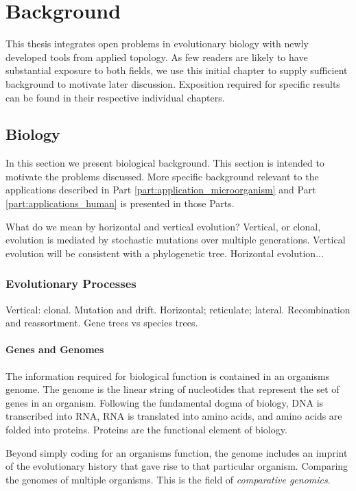 \chapter{Background}
\label{ch:background}

This thesis integrates open problems in evolutionary biology with newly developed tools from applied topology.
As few readers are likely to have substantial exposure to both fields, we use this initial chapter to supply sufficient background to motivate later discussion.
Exposition required for specific results can be found in their respective individual chapters.

\section{Biology}

In this section we present biological background.
This section is intended to motivate the problems discussed.
More specific background relevant to the applications described in Part \ref{part:application_microorganism} and Part \ref{part:applications_human} is presented in those Parts.

What do we mean by horizontal and vertical evolution?
Vertical, or clonal, evolution is mediated by stochastic mutations over multiple generations.
Vertical evolution will be consistent with a phylogenetic tree.
Horizontal evolution...

\subsection{Evolutionary Processes}

Vertical: clonal.
Mutation and drift.
Horizontal; reticulate; lateral.
Recombination and reassortment.
Gene trees vs species trees.

\subsubsection{Genes and Genomes}

The information required for biological function is contained in an organisms genome.
The genome is the linear string of nucleotides that represent the set of genes in an organism.
Following the fundamental dogma of biology, DNA is transcribed into RNA, RNA is translated into amino acids, and amino acids are folded into proteins.
Proteins are the functional element of biology.

Beyond simply coding for an organisms function, the genome includes an imprint of the evolutionary history that gave rise to that particular organism.
Comparing the genomes of multiple organisms.
This is the field of \emph{comparative genomics}.


